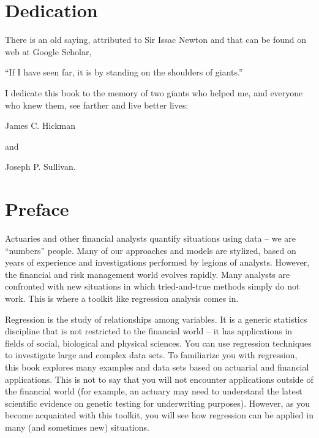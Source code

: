 
\chapter*{Dedication}


There is an old saying, attributed to Sir Issac Newton and that can
be found on web at Google Scholar,


\bigskip\bigskip

\begin{center}
``If I have seen far, it is by standing on the shoulders of
giants.''
\end{center}

\bigskip\bigskip

\noindent I dedicate this book to the memory of two giants who
helped me, and everyone who knew them, see farther and live better
lives:
\bigskip\bigskip


\begin{center}James C. Hickman\end{center}


and



\begin{center}Joseph P. Sullivan.\end{center}



\chapter*{Preface}

\vspace{-1in}

Actuaries and other financial analysts quantify situations using
data -- we are ``numbers'' people. Many of our approaches and models
are stylized, based on years of experience and investigations
performed by legions of analysts. However, the financial and risk
management world evolves rapidly. Many analysts are confronted with
new situations in which tried-and-true methods simply do not work.
This is where a toolkit like regression analysis comes in.

Regression is the study of relationships among variables. It is a
generic statistics discipline that is not restricted to the
financial world -- it has applications in fields of social,
biological and physical sciences. You can use regression techniques
to investigate large and complex data sets. To familiarize you with
regression, this book explores many examples and data sets based on
actuarial and financial applications. This is not to say that you
will not encounter applications outside of the financial world (for
example, an actuary may need to understand the latest scientific
evidence on genetic testing for underwriting purposes). However, as
you become acquainted with this toolkit, you will see how regression
can be applied in many (and sometimes new) situations.

